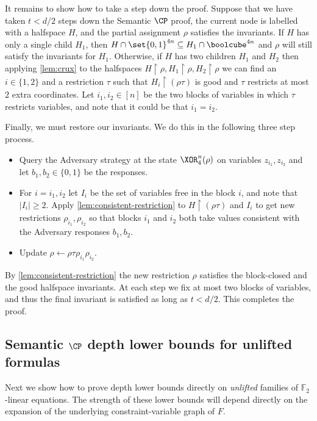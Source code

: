 \documentclass{toc}
\begin{document}
	
It remains to show how to take a step down the proof. 
Suppose that we have taken $t < d/2$ steps down the Semantic $\CP$ proof, the current node is labelled with a halfspace $H$, and the partial assignment $\rho$ satisfies the invariants.
If $H$ has only a single child $H_1$, then $H \cap \set{0,1}^{4n} \subseteq H_1 \cap \boolcube^{4n}$ and $\rho$ will still satisfy the invariants for $H_1$.
Otherwise, if $H$ has two children $H_1$ and $H_2$ then applying \autoref{lem:crux} to the halfspaces $H \restriction \rho, H_1 \restriction \rho, H_2 \restriction \rho$ we can find an $i \in \{1,2\}$ and a restriction $\tau$  such that $H_i \restriction (\rho\tau)$ is good and $\tau$ restricts at most $2$ extra coordinates.
Let $i_1, i_2 \in [n]$ be the two blocks of variables in which $\tau$ restricts variables, and note that it could be that $i_1 = i_2$.
	
Finally, we must restore our invariants.
We do this in the following three step process.
\begin{itemize}
	\item Query the Adversary strategy at the state $\XOR_4^n(\rho)$ on variables $z_{i_1}, z_{i_2}$ and let $b_1, b_2 \in \{0,1\}$ be the responses.
	\item For $i = i_1, i_2$ let $I_i$ be the set of variables free in the block $i$, and note that $|I_i| \geq 2$. 
		Apply \autoref{lem:consistent-restriction} to $H \restriction (\rho\tau)$ and $I_i$ to get new restrictions $\rho_{i_1}, \rho_{i_2}$ so that blocks $i_1$ and $i_2$ both take values consistent with the Adversary responses $b_1, b_2$.
	\item Update $\rho \leftarrow \rho\tau\rho_{i_1}\rho_{i_2}$.
\end{itemize} 
By \autoref{lem:consistent-restriction} the new restriction $\rho$ satisfies the block-closed and the good halfspace invariants.
At each step we fix at most two blocks of variables, and thus the final invariant is satisfied as long as $t < d/2$.
This completes the proof.




\subsection{Semantic \texorpdfstring{$\CP$}{CP} depth lower bounds for unlifted
  formulas}
Next we show how to prove depth lower bounds directly on \emph{unlifted} families of $\mathbb{F}_2$-linear equations. The strength of these lower bounds will depend directly on the expansion of the underlying constraint-variable graph of $F$. 
\end{document}
